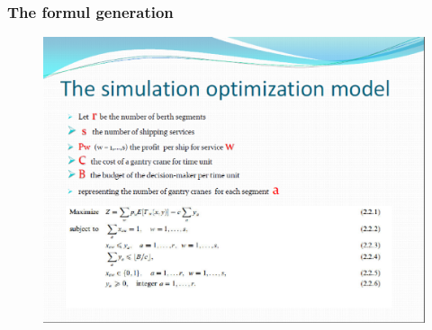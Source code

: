\documentclass{beamer}
\begin{document}
\begin{frame}
\frametitle{The formul generation }
\begin{figure}[!th]
\begin{center}
\includegraphics[width=1\textwidth]{img/pic8.eps}
\end{center}
\end{figure}
\end{frame}
\end{document}
